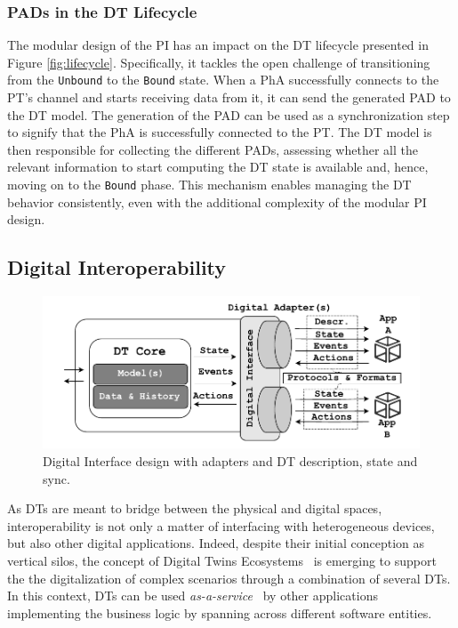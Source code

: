 \subsubsection{\aclp{PAD} in the \ac{DT} Lifecycle}

The modular design of the \ac{PI} has an impact on the \ac{DT} lifecycle presented in Figure \ref{fig:lifecycle}.
%
Specifically, it tackles the open challenge of transitioning from the \texttt{Unbound} to the \texttt{Bound} state.
%
When a \ac{PhA} successfully connects to the \ac{PT}'s channel and starts receiving data from it, it can send the generated \ac{PAD} to the \ac{DT} model.
The generation of the \ac{PAD} can be used as a synchronization step to signify that the \ac{PhA} is successfully connected to the \ac{PT}.
%
The \ac{DT} model is then responsible for collecting the different \acp{PAD}, assessing whether all the relevant information to start computing the \ac{DT} state is available and, hence, moving on to the \texttt{Bound} phase.
%
This mechanism enables managing the \ac{DT} behavior consistently, even with the additional complexity of the modular \ac{PI} design.


\subsection{Digital Interoperability}
\label{sec:digital_interoperability}

\begin{figure}[t]
    \centering
    \includegraphics[width=\columnwidth]{figures/dt-interoperability/dt_interoperability_digital.pdf}
    \caption{Digital Interface design with adapters and DT description, state and sync.}
    \label{fig:digital_interoperability}
\end{figure}

As \acp{DT} are meant to bridge between the physical and digital spaces,
interoperability is not only a matter of interfacing with heterogeneous devices, but also other digital applications.
Indeed, despite their initial conception as vertical silos, the concept of Digital Twins Ecosystems~\cite{web-of-dt-ricci-2022,kendall2021ndt} is emerging to support the the digitalization of complex scenarios through a combination of several \acp{DT}.
%
In this context, \acp{DT} can be used \emph{as-a-service}~\cite{liu2022state} by other applications implementing the business logic by spanning across different software entities.

